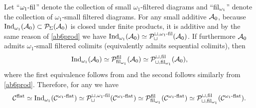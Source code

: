 \documentclass[a4paper,10pt, oneside]{amsart}
\begin{document}
	\begin{rem}\label{altercocomp}
		Let  ``$\omega_1\text{-}\mathrm{fil}$'' denote  the collection of small $\omega_1$-filtered diagrams and ``$\mathrm{fil}_{\omega_1}$'' denote  the collection of $\omega_1$-small filtered diagrams.
		For any small additive \infcat $\mathcal{A}_0$, because $\mathrm{Ind}_{\omega_1}(\mathcal{A}_0)\subset\mathcal{P}_\Sigma(\mathcal{A}_0)$ is closed under finite products, it is additive and by the same reason of \cref{ab6prod} we have $\mathrm{Ind}_{\omega_1}(\mathcal{A}_0) \simeq \mathcal{P}_{\sqcup}^{\sqcup,\omega_1\text{-}\mathrm{fil}}(\mathcal{A}_0)$. If furthermore $\mathcal{A}_0$ admits $\omega_1$-small filtered colimits (equivalently admits sequential colimits), then $$\mathrm{Ind}_{\omega_1}(\mathcal{A}_0)\simeq   \mathcal{P}_{\mathrm{fil}_{\omega_1}}^{\mathrm{fil}}(\mathcal{A}_0)\simeq
		\mathcal{P}_{\sqcup,\mathrm{fil}_{\omega_1}}^{\sqcup,\mathrm{fil}}(\mathcal{A}_0) ,$$ where the first equivalence follows from \cite[\href{https://kerodon.net/tag/0694}{0694} and \href{https://kerodon.net/tag/0695}{0695}]{lurie2025kerodon} and the second follows similarly from \cref{ab6prod}.
		Therefore, for any \dualaddinfcat \mcc we have $$\mathcal{C}^{\mathrm{flat}}\simeq\mathrm{Ind}_{\omega_1}(\mathcal{C}^{\omega_1\text{-}\mathrm{flat}})\simeq \mathcal{P}_{\sqcup}^{\sqcup,\omega_1\text{-}\mathrm{fil}}(\mathcal{C}^{\omega_1\text{-}\mathrm{flat}})\simeq  \mathcal{P}_{\mathrm{fil}_{\omega_1}}^{\mathrm{fil}}(\mathcal{C}^{\omega_1\text{-}\mathrm{flat}})\simeq \mathcal{P}_{\sqcup,\mathrm{fil}_{\omega_1}}^{\sqcup,\mathrm{fil}}(\mathcal{C}^{\omega_1\text{-}\mathrm{flat}}).$$ 
	\end{rem}
\end{document}
